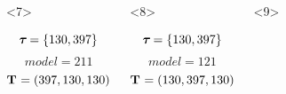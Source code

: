 \begin{frame}
\begin{columns}[c]
\begin{onlyenv}
\begin{minipage}[c][0.5\textheight][c]{\linewidth}
\begin{displaybox}[0.95\linewidth]
\begin{minipage}[c][0.45\textheight][c]{0.95\linewidth}
                    \end{minipage}
                \end{displaybox}
            \end{minipage}
        \end{onlyenv}
        \begin{onlyenv}<7>
            \begin{minipage}[c][0.5\textheight][c]{\linewidth}
                \begin{displaybox}[0.95\linewidth]
                    \begin{minipage}[c][0.45\textheight][c]{0.95\linewidth}
                        \[
                            \boldsymbol{\tau_{}} = \{130,397\}
                        \]\vspace{0mm}
                        \[
                            model = 211
                        \]\vspace{0mm}
                        \[
                            \mathbf{T_{}} = (397,130,130)
                        \]\vspace{0mm}
                    \end{minipage}
                \end{displaybox}
            \end{minipage}
        \end{onlyenv}
        \begin{onlyenv}<8>
            \begin{minipage}[c][0.5\textheight][c]{\linewidth}
                \begin{displaybox}[0.95\linewidth]
                    \begin{minipage}[c][0.45\textheight][c]{0.95\linewidth}
                        \[
                            \boldsymbol{\tau_{}} = \{130,397\}
                        \]\vspace{0mm}
                        \[
                            model = 121
                        \]\vspace{0mm}
                        \[
                            \mathbf{T_{}} = (130,397,130)
                        \]\vspace{0mm}
                    \end{minipage}
                \end{displaybox}
            \end{minipage}
        \end{onlyenv}
        \begin{onlyenv}<9>

\end{onlyenv}
\end{columns}
\end{frame}
